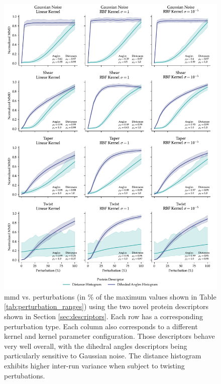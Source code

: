 \begin{figure}[htpb!]
  \includegraphics[width=\textwidth]{./figures/results/res_4.pdf}
  \caption[\gls{mmd} vs. perturbations using the two novel protein
descriptors.]{\gls{mmd} vs. perturbations (in \% of the maximum values
shown in Table \ref{tab:perturbation_ranges}) using the two novel protein
descriptors shown in Section \ref{sec:descriptors}. Each row has a corresponding
perturbation type. Each column also corresponds to a different kernel and kernel
parameter configuration. Those descriptors behave very well overall, with the
dihedral angles descriptors being particularly sensitive to Gaussian noise. The
distance histogram exhibits higher inter-run variance when subject to twisting
pertubations.}
  \label{fig:protein_specific_descriptors}
\end{figure}


